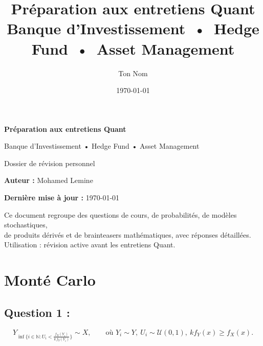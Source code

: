 \documentclass[11pt,a4paper]{article}
\title{\textbf{Préparation aux entretiens Quant}\\[0.5em]
\large Banque d'Investissement \,•\, Hedge Fund \,•\, Asset Management}
\author{Ton Nom}
\date{\today}
\begin{document}
\begin{titlepage}
    \centering
    \vspace*{3cm}
    
    {\Huge \textbf{Préparation aux entretiens Quant}\par}
    \vspace{1cm}
    {\large Banque d'Investissement • Hedge Fund • Asset Management\par}
    
    \vspace{3cm}
    {\large Dossier de révision personnel}\par
    \vspace{0.5cm}
    {\large \textbf{Auteur :} Mohamed Lemine}\par
    \vspace{0.3cm}
    {\large \textbf{Dernière mise à jour :} \today}\par
    
    \vfill
    
    {\small
    Ce document regroupe des questions de cours, de probabilités, de modèles stochastiques,\\
    de produits dérivés et de brainteasers mathématiques, avec réponses détaillées.\\[0.5em]
    Utilisation : révision active avant les entretiens Quant.
    }
    
\end{titlepage}

\tableofcontents
\newpage



\section{Monté Carlo}

\subsection{Question 1 :}


\[
Y_{\inf\{ i \in \mathbb{N} : U_i < \tfrac{f_X(Y_i)}{k\, f_Y(Y_i)} \}}
\sim X,
\qquad
\text{où } Y_i \sim Y,\ U_i \sim \mathcal{U}(0,1),\ k f_Y(x) \ge f_X(x).
\]



\end{document}
